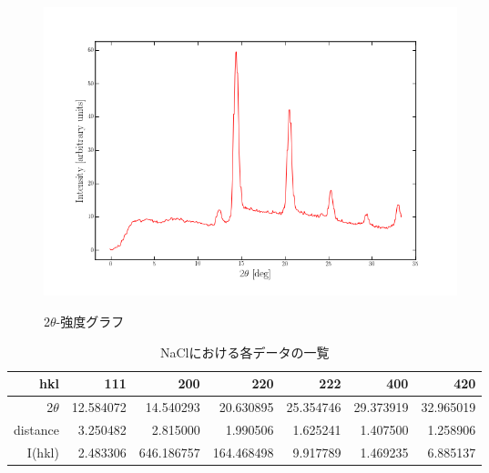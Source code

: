 \documentclass[a4paper,12pt]{jarticle}
\begin{document}
   \begin{figure}[htbp]
    \begin{center}
     \includegraphics[clip,width=12.0cm]{NaCL_plot.png}
     \label{fig:NaCl_plot}
     \caption{2$\theta$-強度グラフ}
    \end{center}
   \end{figure}

   \begin{table}[htbp]
    \begin{center}

       \caption{NaClにおける各データの一覧}
        \begin{tabular}{|r|r|r|r|r|r|r|}
         \hline
                 hkl   &     111   &     200   &     220   &       222 &       400 &       420 \\
         \hline
			2$\theta$  & 12.584072 & 14.540293 & 20.630895 & 25.354746 & 29.373919 & 32.965019 \\
			distance   & 3.250482  & 2.815000  & 1.990506  & 1.625241  & 1.407500  & 1.258906 \\
			I(hkl)   & 2.483306  & 646.186757 & 164.468498 &  9.917789 &  1.469235 &  6.885137 \\
         \hline

         \hline
        \end{tabular}
       \label{table:NaCl}

      \end{center}
     \end{table}
     
\end{document}
